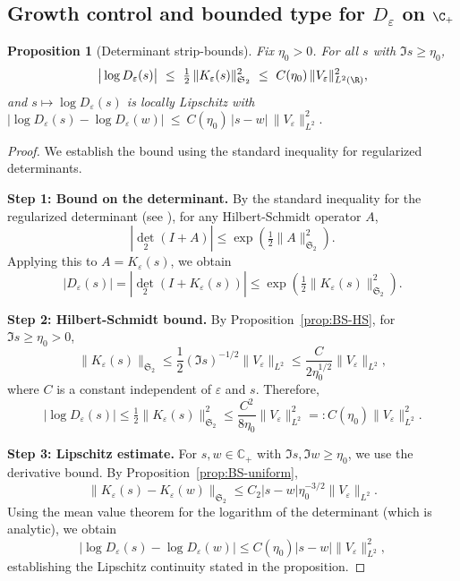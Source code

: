 ﻿\documentclass[12pt,a4paper]{article}
\newtheorem{proposition}[theorem]{Proposition}
\theoremstyle{definition}
\theoremstyle{remark}
\newcommand{\CC}{\mathbb{C}}
\begin{document}
\subsection{Growth control and bounded type for $D_\varepsilon$ on $\C_+$}\label{subsec:growth-det2}
\begin{proposition}[Determinant strip-bounds]\label{prop:det2-bounds}
Fix $\eta_0>0$. For all $s$ with $\Im s\ge\eta_0$,
\begin{equation}\label{eq:det2-strip}
  \big|\log D_\varepsilon(s)\big|\ \le\ \tfrac12\,\|K_\varepsilon(s)\|_{\mathfrak S_2}^2
  \ \le\ C(\eta_0)\,\|V_\varepsilon\|_{L^2(\R)}^2,
\end{equation}
and $s\mapsto \log D_\varepsilon(s)$ is locally Lipschitz with
\(
  \big|\log D_\varepsilon(s)-\log D_\varepsilon(w)\big|\ \le\ C(\eta_0)\,|s-w|\,\|V_\varepsilon\|_{L^2}^2.
\)
\end{proposition}
\begin{proof}
We establish the bound using the standard inequality for regularized determinants.

\textbf{Step 1: Bound on the determinant.}
By the standard inequality for the regularized determinant (see \cite[Thm.~3.7]{SimonTraceIdeals}), for any Hilbert-Schmidt operator $A$,
\[
  |\det_2(I+A)| \leq \exp\left(\tfrac12\|A\|_{\mathfrak{S}_2}^2\right).
\]
Applying this to $A = K_\varepsilon(s)$, we obtain
\[
  |D_\varepsilon(s)| = |\det_2(I+K_\varepsilon(s))| \leq \exp\left(\tfrac12\|K_\varepsilon(s)\|_{\mathfrak{S}_2}^2\right).
\]

\textbf{Step 2: Hilbert-Schmidt bound.}
By Proposition~\ref{prop:BS-HS}, for $\Im s \geq \eta_0 > 0$,
\[
  \|K_\varepsilon(s)\|_{\mathfrak{S}_2} \leq \frac{1}{2}(\Im s)^{-1/2}\|V_\varepsilon\|_{L^2} \leq \frac{C}{2\eta_0^{1/2}}\|V_\varepsilon\|_{L^2},
\]
where $C$ is a constant independent of $\varepsilon$ and $s$. Therefore,
\[
  |\log D_\varepsilon(s)| \leq \tfrac12\|K_\varepsilon(s)\|_{\mathfrak{S}_2}^2 \leq \frac{C^2}{8\eta_0}\|V_\varepsilon\|_{L^2}^2 =: C(\eta_0)\|V_\varepsilon\|_{L^2}^2.
\]

\textbf{Step 3: Lipschitz estimate.}
For $s, w \in \CC_+$ with $\Im s, \Im w \geq \eta_0$, we use the derivative bound. By Proposition~\ref{prop:BS-uniform},
\[
  \|K_\varepsilon(s) - K_\varepsilon(w)\|_{\mathfrak{S}_2} \leq C_2|s-w|\eta_0^{-3/2}\|V_\varepsilon\|_{L^2}.
\]
Using the mean value theorem for the logarithm of the determinant (which is analytic), we obtain
\[
  |\log D_\varepsilon(s) - \log D_\varepsilon(w)| \leq C(\eta_0)|s-w|\|V_\varepsilon\|_{L^2}^2,
\]
establishing the Lipschitz continuity stated in the proposition.
\end{proof}
\end{document}
